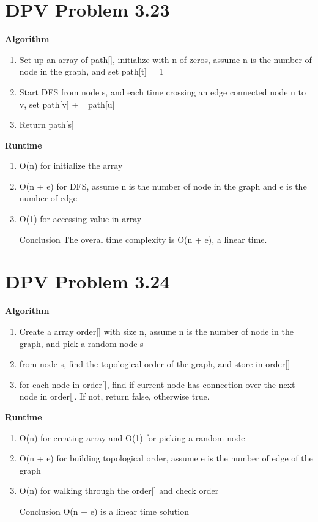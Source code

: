 \documentclass{article}
\begin{document}
\section{DPV Problem 3.23}

\textbf{Algorithm}
\begin{enumerate}[Step 1]
    \item Set up an array of path[], initialize with n of zeros, assume n is the number of node in the graph, and set path[t] = 1
    \item Start DFS from node s, and each time crossing an edge connected node u to v, set path[v] += path[u]
    \item Return path[s]
\end{enumerate}

\textbf{Runtime}
\begin{enumerate}[Step 1]
    \item O(n) for initialize the array
    \item O(n + e) for DFS, assume n is the number of node in the graph and e is the number of edge
    \item O(1) for accessing value in array
    \item [Conclusion] The overal time complexity is O(n + e), a linear time.
\end{enumerate}

\section{DPV Problem 3.24}

\textbf{Algorithm}
\begin{enumerate}[Step 1]
    \item Create a array order[] with size n, assume n is the number of node in the graph, and pick a random node s
    \item from node s, find the topological order of the graph, and store in order[]
    \item for each node in order[], find if current node has connection over the next node in order[]. If not, return false, otherwise true.
\end{enumerate}

\textbf{Runtime}
\begin{enumerate}[Step 1]
    \item O(n) for creating array and O(1) for picking a random node
    \item O(n + e) for building topological order, assume e is the number of edge of the graph
    \item O(n) for walking through the order[] and check order
    \item [Conclusion] O(n + e) is a linear time solution
\end{enumerate}
\end{document}
